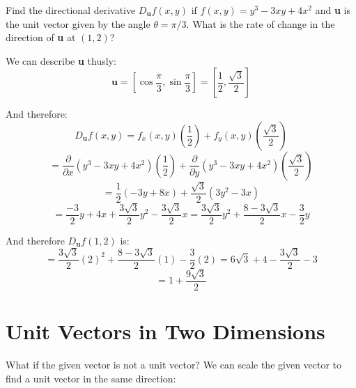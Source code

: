 \begin{Worked}
\begin{Problem}
Find the directional derivative $D_{\textbf{u}} f(x, y)$ if 
$f(x, y) = y^3 - 3xy + 4x^2$ and \textbf{u} is the unit vector given by the 
angle $\theta = \pi/3$. What is the rate of change in the direction of 
\textbf{u} at $(1, 2)$?
\end{Problem}
\begin{Solution}
We can describe \textbf{u} thusly:
$$\textbf{u} = \left[ \cos{ \frac{\pi}{3} }, \sin{ \frac{\pi}{3}} \right] = 
\left[ \frac{1}{2}, \frac{\sqrt{3}}{2} \right]$$

And therefore:
$$D_{\textbf{u}} f(x, y) = f_x(x, y) \left( \frac{1}{2} \right) + f_y(x, y) 
\left( \frac{\sqrt{3}}{2} \right) $$
$$= \frac{\partial}{\partial x} \left( y^3 - 3xy + 4x^2 \right) \left( 
\frac{1}{2} \right) + \frac{\partial}{\partial y} \left( y^3 - 3xy + 4x^2 
\right) \left( \frac{\sqrt{3}}{2} \right)$$
$$= \frac{1}{2} \left( -3y + 8x \right) + \frac{\sqrt{3}}{2} \left( 3y^2 - 3x 
\right)$$
$$= \frac{-3}{2}y + 4x + \frac{3\sqrt{3}}{2}y^2 - \frac{3\sqrt{3}}{2}x = \frac{
3\sqrt{3}}{2}y^2 + \frac{8-3\sqrt{3}}{2}x - \frac{3}{2}y$$

And therefore $D_{\textbf{u}} f(1, 2)$ is:
$$= \frac{3\sqrt{3}}{2} \left( 2 \right)^2 + \frac{8 - 3\sqrt{3}}{2} \left( 1 
\right) - \frac{3}{2} \left( 2 \right) = 6\sqrt{3} + 4 - \frac{3\sqrt{3}}{2} - 
3$$
$$= 1 + \frac{9\sqrt{3}}{2}$$
\end{Solution}
\end{Worked}

\section{Unit Vectors in Two Dimensions}

What if the given vector is not a unit vector? We can scale the given vector 
to find a unit vector in the same direction:

